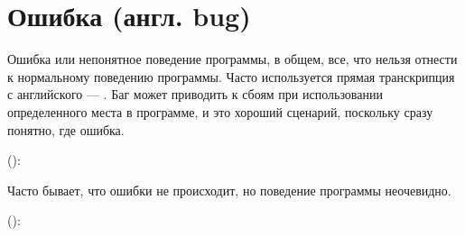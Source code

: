\documentclass[letterpaper,10pt,russian]{sphinxmanual}
\begin{document}
\section{Ошибка (англ. bug)}
\label{\detokenize{educational_materials/terms/content:bug}}
\sphinxAtStartPar
Ошибка или непонятное поведение программы, в общем, все, что нельзя отнести к нормальному поведению программы. Часто используется прямая транскрипция с английского — . Баг может приводить к сбоям при использовании определенного места в программе, и это хороший сценарий, поскольку сразу понятно, где ошибка. 

\sphinxAtStartPar
():

\begin{sphinxVerbatim}[commandchars=\\\{\}]
 

     

      
          

   
      
\end{sphinxVerbatim}

\sphinxAtStartPar
Часто бывает, что ошибки не происходит, но поведение программы неочевидно.

\sphinxAtStartPar
():
\end{document}
